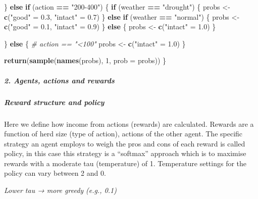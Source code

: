 \documentclass[
]{article}
\newenvironment{Shaded}{\begin{snugshade}}{\end{snugshade}}
\newcommand{\AttributeTok}[1]{\textcolor[rgb]{0.13,0.29,0.53}{#1}}
\newcommand{\CommentTok}[1]{\textcolor[rgb]{0.56,0.35,0.01}{\textit{#1}}}
\newcommand{\ControlFlowTok}[1]{\textcolor[rgb]{0.13,0.29,0.53}{\textbf{#1}}}
\newcommand{\DecValTok}[1]{\textcolor[rgb]{0.00,0.00,0.81}{#1}}
\newcommand{\FloatTok}[1]{\textcolor[rgb]{0.00,0.00,0.81}{#1}}
\newcommand{\FunctionTok}[1]{\textcolor[rgb]{0.13,0.29,0.53}{\textbf{#1}}}
\newcommand{\NormalTok}[1]{#1}
\newcommand{\OtherTok}[1]{\textcolor[rgb]{0.56,0.35,0.01}{#1}}
\newcommand{\SpecialCharTok}[1]{\textcolor[rgb]{0.81,0.36,0.00}{\textbf{#1}}}
\newcommand{\StringTok}[1]{\textcolor[rgb]{0.31,0.60,0.02}{#1}}
\begin{document}
\begin{Shaded}
\begin{Highlighting}[]
\NormalTok{  \} }\ControlFlowTok{else} \ControlFlowTok{if}\NormalTok{ (action }\SpecialCharTok{==} \StringTok{"200{-}400"}\NormalTok{) \{}
    \ControlFlowTok{if}\NormalTok{ (weather }\SpecialCharTok{==} \StringTok{"drought"}\NormalTok{) \{}
\NormalTok{      probs }\OtherTok{\textless{}{-}} \FunctionTok{c}\NormalTok{(}\StringTok{"good"} \OtherTok{=} \FloatTok{0.3}\NormalTok{, }\StringTok{"intact"} \OtherTok{=} \FloatTok{0.7}\NormalTok{)}
\NormalTok{    \} }\ControlFlowTok{else} \ControlFlowTok{if}\NormalTok{ (weather }\SpecialCharTok{==} \StringTok{"normal"}\NormalTok{) \{}
\NormalTok{      probs }\OtherTok{\textless{}{-}} \FunctionTok{c}\NormalTok{(}\StringTok{"good"} \OtherTok{=} \FloatTok{0.1}\NormalTok{, }\StringTok{"intact"} \OtherTok{=} \FloatTok{0.9}\NormalTok{)}
\NormalTok{    \} }\ControlFlowTok{else}\NormalTok{ \{}
\NormalTok{      probs }\OtherTok{\textless{}{-}} \FunctionTok{c}\NormalTok{(}\StringTok{"intact"} \OtherTok{=} \FloatTok{1.0}\NormalTok{)}
\NormalTok{    \}}
    
\NormalTok{  \} }\ControlFlowTok{else}\NormalTok{ \{  }\CommentTok{\# action == "\textless{}100"}
\NormalTok{    probs }\OtherTok{\textless{}{-}} \FunctionTok{c}\NormalTok{(}\StringTok{"intact"} \OtherTok{=} \FloatTok{1.0}\NormalTok{)}
\NormalTok{  \}}
  
  \FunctionTok{return}\NormalTok{(}\FunctionTok{sample}\NormalTok{(}\FunctionTok{names}\NormalTok{(probs), }\DecValTok{1}\NormalTok{, }\AttributeTok{prob =}\NormalTok{ probs))}
\NormalTok{\}}
\end{Highlighting}
\end{Shaded}

\hypertarget{agents-actions-and-rewards}{%
\subparagraph{\texorpdfstring{\textbf{2. Agents, actions and
rewards}}{2. Agents, actions and rewards}}\label{agents-actions-and-rewards}}

\hypertarget{reward-structure-and-policy}{%
\subparagraph{Reward structure and
policy}\label{reward-structure-and-policy}}

Here we define how income from actions (rewards) are calculated. Rewards
are a function of herd size (type of action), actions of the other
agent. The specific strategy an agent employs to weigh the pros and cons
of each reward is called policy, in this case this strategy is a
``softmax'' approach which is to maximise rewards with a moderate tau
(temperature) of 1. Temperature settings for the policy can vary between
2 and 0.

\emph{Lower tau → more greedy (e.g., 0.1)}
\end{document}

